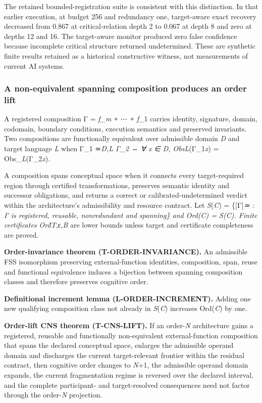 The retained bounded-registration suite is consistent with this
distinction. In that earlier execution, at budget 256 and redundancy
one, target-aware exact recovery decreased from 0.867 at
critical-relation depth 2 to 0.067 at depth 8 and zero at depths 12 and
16. The target-aware monitor produced zero false confidence because
incomplete critical structure returned undetermined. These are synthetic
finite results retained as a historical constructive witness, not
measurements of current AI systems.

\hypertarget{a-non-equivalent-spanning-composition-produces-an-order-lift}{%
\subsubsection{A non-equivalent spanning composition produces an order
lift}\label{a-non-equivalent-spanning-composition-produces-an-order-lift}}

A registered composition Γ = \emph{f\_m} ∘ ⋯ ∘ \emph{f}\_1 carries
identity, signature, domain, codomain, boundary conditions, execution
semantics and preserved invariants. Two compositions are functionally
equivalent over admissible domain \emph{D} and target language \emph{L}
when Γ\_1 ≃\emph{\emph{D},\emph{L} Γ\_2 ⇔ ∀ \emph{x} ∈ \emph{D},
ObsL}(Γ\_1\emph{x}) = Obs\_\emph{L}(Γ\_2\emph{x}).

A composition spans conceptual space when it connects every
target-required region through certified transformations, preserves
semantic identity and successor obligations, and returns a correct or
calibrated-undetermined verdict within the architecture's admissibility
and resource contract. Let \emph{S}(\emph{C}) = \{{[}Γ{]}\emph{≃ : Γ is
registered, reusable, nonredundant and spanning\} and Ord(\emph{C}) =
\textbar{}\emph{S}(\emph{C})\textbar. Finite certificates
Ord̂T},ε,\emph{B} are lower bounds unless target and certificate
completeness are proved.

\textbf{Order-invariance theorem (T-ORDER-INVARIANCE).} An admissible
FSS isomorphism preserving external-function identities, composition,
span, reuse and functional equivalence induces a bijection between
spanning composition classes and therefore preserves cognitive order.

\textbf{Definitional increment lemma (L-ORDER-INCREMENT).} Adding one
new qualifying composition class not already in \emph{S}(\emph{C})
increases Ord(\emph{C}) by one.

\textbf{Order-lift CNS theorem (T-CNS-LIFT).} If an order-\emph{N}
architecture gains a registered, reusable and functionally
non-equivalent external-function composition that spans the declared
conceptual space, enlarges the admissible operand domain and discharges
the current target-relevant frontier within the residual contract, then
cognitive order changes to \emph{N}+1, the admissible operand domain
expands, the current fragmentation regime is reversed over the declared
interval, and the complete participant- and target-resolved consequences
need not factor through the order-\emph{N} projection.

